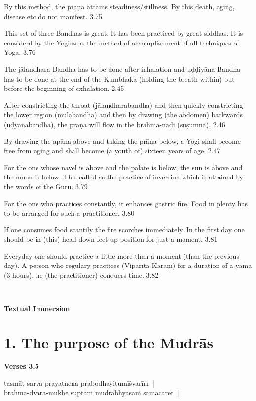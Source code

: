 By this method, the prāṇa attains steadiness/stillness. By this death, aging, disease etc do not manifest. 3.75

This set of three Bandhas is great. It has been practiced by great siddhas. It is considerd by the Yogins as the method of accomplishment of all techniques of Yoga.   3.76


The jālandhara Bandha has to be done after inhalation and uḍḍiyāna Bandha has to be done at the end of the Kumbhaka (holding the breath within) but before the beginning of exhalation. 2.45

After constricting the throat (jālandharabandha) and then quickly constricting the lower region (mūlabandha) and then by drawing (the abdomen) backwards (uḍyānabandha), the prāṇa will flow in the brahma-nāḍi (suṣumnā). 2.46

By drawing the apāna above and taking the prāṇa below, a Yogi shall become free from aging and shall become (a youth of) sixteen years of age. 2.47


For the one whose navel is above and the palate is below, the sun is above and the moon is below. This called as the practice of inversion which is attained by the words of the Guru. 3.79

For the one who practices constantly, it enhances gastric fire. Food in plenty has to be arranged for such a practitioner. 3.80

If one consumes food scantily the fire scorches immediately. In the first day one should be in (this) head-down-feet-up position for just a moment. 3.81

Everyday one should practice a little more than a moment (than the previous day). A person who regulary practices (Viparīta Karaṇī) for a duration of a yāma (3 hours), he (the practitioner) conquers time. 3.82
\newpage

\thispagestyle{empty}
~\vfill
\centerline{\textbf{\LARGE Textual Immersion}}
\vfill
\eject

\section*{1. The purpose of the Mudrās}

\noindent 
\textbf{Verses  3.5}

\begin{shloka}
tasmāt sarva-prayatnena prabodhayitumīśvarīm |\\
brahma-dvāra-mukhe suptāṁ mudrābhyāsaṁ samācaret ||
\end{shloka}

